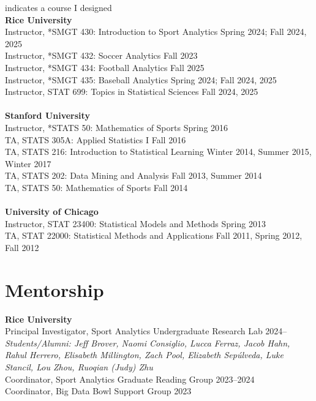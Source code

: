 \documentclass{article}
\begin{document}
\vspace{-4mm}\hfill * indicates a course I designed\\
{\bf Rice University}\\
Instructor, *SMGT 430: Introduction to Sport Analytics \hfill Spring 2024; Fall 2024, 2025\\
Instructor, *SMGT 432: Soccer Analytics \hfill Fall 2023\\
Instructor, *SMGT 434: Football Analytics \hfill Fall 2025\\
Instructor, *SMGT 435: Baseball Analytics \hfill Spring 2024; Fall 2024, 2025\\
Instructor, STAT 699: Topics in Statistical Sciences \hfill Fall 2024, 2025\\
~\\
{\bf Stanford University}\\
Instructor, *STATS 50: Mathematics of Sports \hspace{5mm} \hfill Spring 2016\\
TA, STATS 305A: Applied Statistics I \hfill Fall 2016\\
TA, STATS 216: Introduction to Statistical Learning \hfill Winter 2014, Summer 2015, Winter 2017\\
TA, STATS 202: Data Mining and Analysis \hfill Fall 2013, Summer 2014\\
TA, STATS 50: Mathematics of Sports \hfill Fall 2014\\
~\\
{\bf University of Chicago}\\
Instructor, STAT 23400: Statistical Models and Methods \hfill Spring 2013\\
TA, STAT 22000: Statistical Methods and Applications \hfill Fall 2011, Spring 2012, Fall 2012


\section*{\sc Mentorship}

{\bf Rice University}\\
Principal Investigator, Sport Analytics Undergraduate Research Lab \hfill 2024--\\
{\it Students/Alumni: Jeff Brover, Naomi Consiglio, Lucca Ferraz, Jacob Hahn, Rahul Herrero, Elisabeth Millington, Zach Pool, Elizabeth Sep\'ulveda, Luke Stancil, Lou Zhou, Ruoqian (Judy) Zhu}\\
Coordinator, Sport Analytics Graduate Reading Group \hfill 2023--2024\\
Coordinator, Big Data Bowl Support Group \hfill 2023
\end{document}
